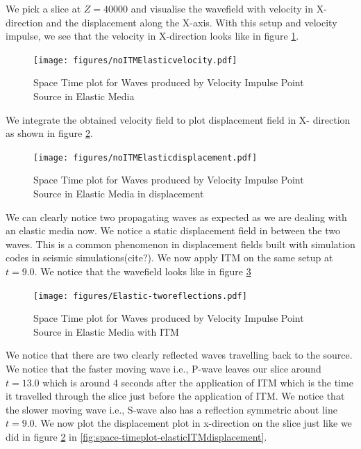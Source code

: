 We pick a slice at $Z = 40000$ and visualise the wavefield with velocity in X-direction and the displacement along the X-axis. With this setup and velocity impulse, 
we see that the velocity in X-direction looks like in figure \ref{fig:space-timeplot-elasticnoITM}.

\begin{figure}
    \centering
    \texttt{[image: figures/noITMElasticvelocity.pdf]}
    \caption{Space Time plot for Waves produced by Velocity Impulse Point Source in Elastic Media}
    \label{fig:space-timeplot-elasticnoITM}
\end{figure}

We integrate the obtained velocity field to plot displacement field in X- direction as shown in figure \ref{fig:space-timeplot-elasticnoITMdisplacement}.

\begin{figure}
    \centering
    \texttt{[image: figures/noITMElasticdisplacement.pdf]}
    \caption{Space Time plot for Waves produced by Velocity Impulse Point Source in Elastic Media in displacement}
    \label{fig:space-timeplot-elasticnoITMdisplacement}
\end{figure}

We can clearly notice two propagating waves as expected as we are dealing with an elastic media now. We notice a static displacement field in between the two waves.
This is a common phenomenon in displacement fields built with simulation codes in seismic simulations(cite?). 
We now apply \ac{ITM} on the same setup at $t=9.0$. We notice that the wavefield looks like in figure \ref{fig:space-timeplot-elasticITM}

\begin{figure}
    \centering
    \texttt{[image: figures/Elastic-tworeflections.pdf]}
    \caption{Space Time plot for Waves produced by Velocity Impulse Point Source in Elastic Media with \ac{ITM}}
    \label{fig:space-timeplot-elasticITM}
\end{figure}

We notice that there are two clearly reflected waves travelling back to the source. We notice that the faster moving wave i.e., P-wave leaves our slice around 
$t=13.0$ which is around 4 seconds after the application of \ac{ITM} which is the time it travelled through the slice just before the application of \ac{ITM}. 
We notice that the slower moving wave i.e., S-wave also has a reflection symmetric about line $t=9.0$. We now plot the displacement plot in x-direction on the 
slice just like we did in figure \ref{fig:space-timeplot-elasticnoITMdisplacement} in \ref{fig:space-timeplot-elasticITMdisplacement}.

